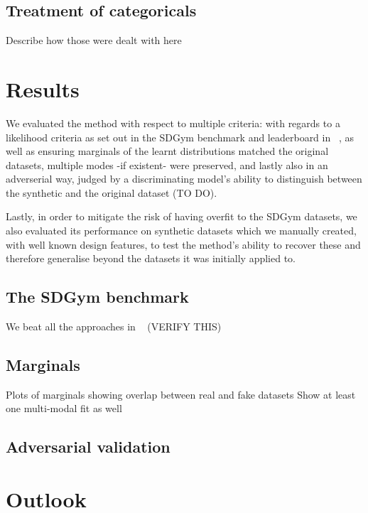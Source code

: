 \documentclass{article}
\begin{document}
\subsection{Treatment of categoricals}

Describe how those were dealt with here



\section{Results}
\label{results-section}

We evaluated the method with respect to multiple criteria: with regards to a likelihood criteria as set out in the SDGym benchmark and leaderboard in ~\cite{xu2019modeling}, as well as ensuring marginals of the learnt distributions matched the original datasets, multiple modes -if existent- were preserved, and lastly also in an adverserial way, judged by a discriminating model's ability to distinguish between the synthetic and the original dataset (TO DO).

Lastly, in order to mitigate the risk of having overfit to the SDGym datasets, we also evaluated its performance on synthetic datasets which we manually created, with well known design features, to test the method's ability to recover these and therefore generalise beyond the datasets it was initially applied to.

\subsection{The SDGym benchmark}

We beat all the approaches in ~\cite{xu2019modeling} (VERIFY THIS)

\subsection{Marginals}

Plots of marginals showing overlap between real and fake datasets  
Show at least one multi-modal fit as well

\subsection{Adversarial validation}


\section{Outlook}
\label{outlook-section}
\end{document}
